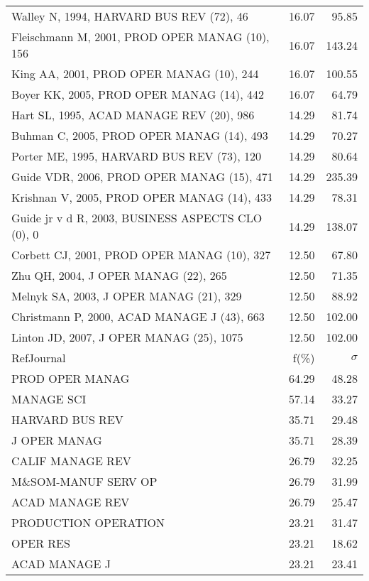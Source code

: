 \documentclass[a4paper,11pt]{report}
\begin{document}
\begin{landscape}
\begin{table}[!ht]
{\begin{tabular}{|l r r|}
Walley N, 1994, HARVARD BUS REV (72), 46 & 16.07 & 95.85\\
Fleischmann M, 2001, PROD OPER MANAG (10), 156 & 16.07 & 143.24\\
King AA, 2001, PROD OPER MANAG (10), 244 & 16.07 & 100.55\\
Boyer KK, 2005, PROD OPER MANAG (14), 442 & 16.07 & 64.79\\
Hart SL, 1995, ACAD MANAGE REV (20), 986 & 14.29 & 81.74\\
Buhman C, 2005, PROD OPER MANAG (14), 493 & 14.29 & 70.27\\
Porter ME, 1995, HARVARD BUS REV (73), 120 & 14.29 & 80.64\\
Guide VDR, 2006, PROD OPER MANAG (15), 471 & 14.29 & 235.39\\
Krishnan V, 2005, PROD OPER MANAG (14), 433 & 14.29 & 78.31\\
Guide jr v d R, 2003, BUSINESS ASPECTS CLO (0), 0 & 14.29 & 138.07\\
Corbett CJ, 2001, PROD OPER MANAG (10), 327 & 12.50 & 67.80\\
Zhu QH, 2004, J OPER MANAG (22), 265 & 12.50 & 71.35\\
Melnyk SA, 2003, J OPER MANAG (21), 329 & 12.50 & 88.92\\
Christmann P, 2000, ACAD MANAGE J (43), 663 & 12.50 & 102.00\\
Linton JD, 2007, J OPER MANAG (25), 1075 & 12.50 & 102.00\\
\hline
\hline
RefJournal & f(\%) & $\sigma$\\
\hline
PROD OPER MANAG & 64.29 & 48.28\\
MANAGE SCI & 57.14 & 33.27\\
HARVARD BUS REV & 35.71 & 29.48\\
J OPER MANAG & 35.71 & 28.39\\
CALIF MANAGE REV & 26.79 & 32.25\\
M\&SOM-MANUF SERV OP & 26.79 & 31.99\\
ACAD MANAGE REV & 26.79 & 25.47\\
PRODUCTION OPERATION & 23.21 & 31.47\\
OPER RES & 23.21 & 18.62\\
ACAD MANAGE J & 23.21 & 23.41\\
\hline
\end{tabular}
}
\end{table}

\clearpage


\end{landscape}
\end{document}
